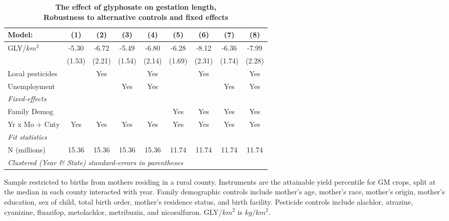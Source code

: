 \begin{table}[htbp]
   \centering
   \small
   \begin{threeparttable}[b]
      \caption{\label{tab:robust-cntrl-gestation-allyielddiffgmo500} \textbf{The effect of glyphosate on gestation length, \\ Robustness to alternative controls and fixed effects}}
      \begin{tabular}{lcccccccc}
         \toprule
         Model:           & (1)    & (2)    & (3)    & (4)    & (5)    & (6)    & (7)    & (8)\\  
         \midrule 
         GLY/$km^2$       & -5.30  & -6.72  & -5.49  & -6.80  & -6.28  & -8.12  & -6.36  & -7.99\\   
                          & (1.53) & (2.21) & (1.54) & (2.14) & (1.69) & (2.31) & (1.74) & (2.28)\\   
         Local pesticides &        & Yes    &        & Yes    &        & Yes    &        & Yes\\  
         Unemployment     &        &        & Yes    & Yes    &        &        & Yes    & Yes\\  
         \midrule
         \emph{Fixed-effects}\\
         Family Demog     &        &        &        &        & Yes    & Yes    & Yes    & Yes\\  
         Yr x Mo + Cnty   & Yes    & Yes    & Yes    & Yes    & Yes    & Yes    & Yes    & Yes\\  
         \midrule
         \emph{Fit statistics}\\
         N (millions)     & 15.36  & 15.36  & 15.36  & 15.36  & 11.74  & 11.74  & 11.74  & 11.74\\  
         \midrule
         \multicolumn{9}{l}{\emph{Clustered (Year \& State) standard-errors in parentheses}}\\
      \end{tabular}
      
      \begin{tablenotes}\item Sample restricted to births from mothers residing in a rural county. Instruments are the attainable yield percentile for GM crops, split at the median in each county interacted with year. Family demographic controls include mother's age, mother's race, mother's origin, mother's education, sex of child, total birth order, mother's residence status, and birth facility. Pesticide controls include alachlor, atrazine, cyanizine, fluazifop, metolachlor, metribuzin, and nicosulfuron. GLY/$km^2$ is $kg/km^2$.
      \end{tablenotes}
   \end{threeparttable}
\end{table}

